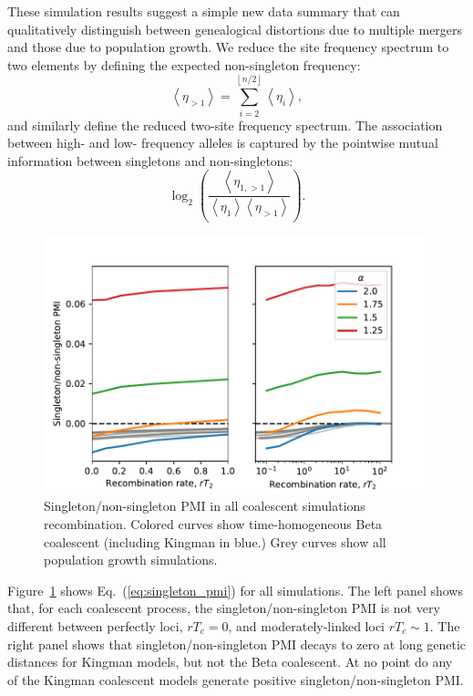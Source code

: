 \documentclass[11pt, letterpaper]{article}   	%
\newcommand{\eq}[1]{Eq.~(\ref{#1})}
\newcommand{\Fig}[1]{Figure~\ref{#1}}
\newcommand{\E}[1]{\left<{#1}\right>}
\begin{document}
These simulation results suggest a simple new data summary that can qualitatively distinguish between genealogical distortions due to multiple mergers and those due to population growth.
We reduce the site frequency spectrum to two elements by defining the expected non-singleton frequency:
\begin{equation}
\E{\eta_{>1}} = \sum_{i=2}^{\left \lfloor n/2 \right \rfloor} \E{\eta_i},
\end{equation}
and similarly define the reduced two-site frequency spectrum.
The association between high- and low- frequency alleles is captured by the pointwise mutual information between singletons and non-singletons:
\begin{equation}
\log_2 \left( \frac{\E{\eta_{1,>1}}}{\E{\eta_1} \E{\eta_{>1}}} \right).
\label{eq:singleton_pmi}
\end{equation}

\begin{figure}
\centering
\includegraphics[width=\textwidth]{figures/singleton_pmi_all.pdf}
\caption{Singleton/non-singleton PMI in all coalescent simulations recombination. Colored curves show time-homogeneous Beta coalescent (including Kingman in blue.) Grey curves show all population growth simulations. \label{fig:singleton_pmi}}
\end{figure}

\Fig{fig:singleton_pmi} shows \eq{eq:singleton_pmi} for all simulations.
The left panel shows that, for each coalescent process, the singleton/non-singleton PMI is not very different between perfectly loci, $rT_c=0$, and moderately-linked loci $rT_c \sim 1$.
The right panel shows that singleton/non-singleton PMI decays to zero at long genetic distances for Kingman models, but not the Beta coalescent. 
At no point do any of the Kingman coalescent models generate positive singleton/non-singleton PMI.
\end{document}
